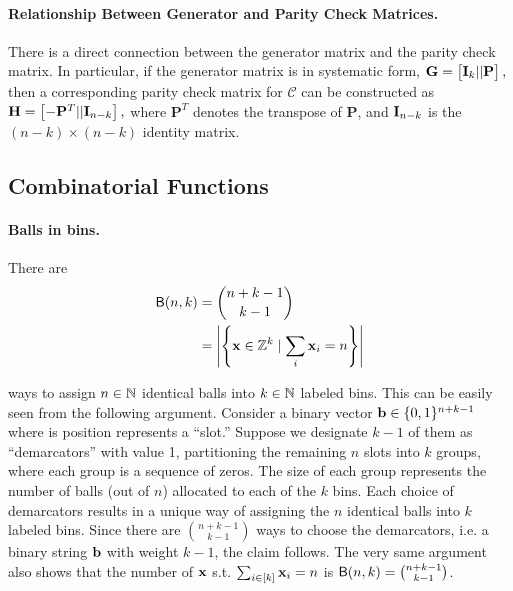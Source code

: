 \paragraph{Relationship Between Generator and Parity Check Matrices.}
There is a direct connection between the generator matrix and the parity check matrix. In particular, if the generator matrix is in systematic form, 
\(
\mathbf{G} = \begin{bmatrix} \mathbf{I}_k || \mathbf{P} \end{bmatrix},
\)
then a corresponding parity check matrix for $\mathcal{C}$ can be constructed as
\(
\mathbf{H} = \begin{bmatrix} -\mathbf{P}^T || \mathbf{I}_{n-k} \end{bmatrix},
\)
where $\mathbf{P}^T$ denotes the transpose of $\mathbf{P}$, and $\mathbf{I}_{n-k}$ is the $(n-k)\times (n-k)$ identity matrix.



\subsection{Combinatorial Functions}\label{ssec:bb}

\paragraph{Balls in bins.} There are
\begin{align*}
\mathsf{B}(n,k)&=\binom{n+k-1}{k-1}\\
&= \left|\left\{ \mathbf{x}\in \mathbb{Z}^k \mid \sum_i \mathbf{x}_i = n \right\}\right|
\end{align*}

ways to assign $n \in \mathbb{N}$ identical balls into $k \in \mathbb{N}$ labeled bins. This can be easily seen from the following argument. Consider a binary vector $\mathbf{b}\in\{0,1\}^{n+k-1}$ where is position represents a ``slot.'' Suppose we designate \(k - 1\) of them as ``demarcators'' with value 1, partitioning the remaining \(n\) slots into \(k\) groups, where each group is a sequence of zeros. The size of each group represents the number of balls (out of \(n\)) allocated to each of the \(k\) bins.
 Each choice of demarcators results in a unique way of assigning the $n$ identical balls into $k$ labeled bins. Since there are $\binom{n+k-1}{k-1}$ ways to choose the demarcators, i.e. a binary string $\mathbf{b}$ with weight $k-1$, the claim follows. The very same argument also shows that the number of $\mathbf{x}$ s.t. $\sum_{i\in[k]}\mathbf{x}_i = n$ is $
\mathsf{B}(n,k)=\binom{n+k-1}{k-1}
$.\\  

